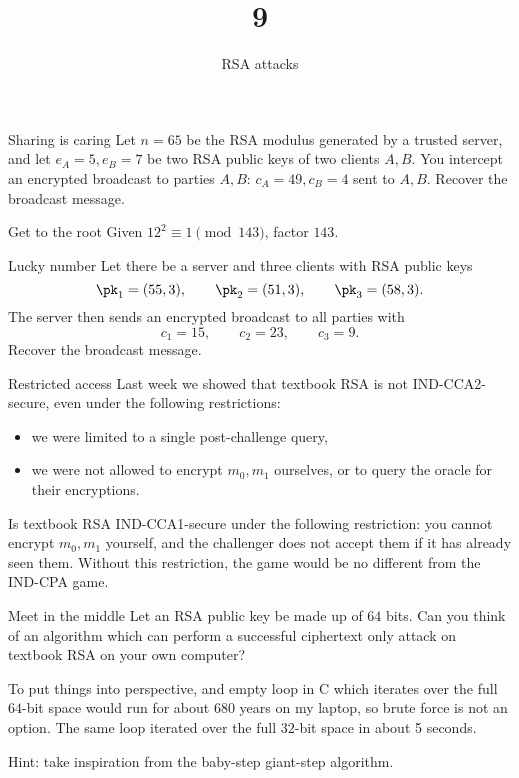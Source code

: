 \documentclass{practice}
\title{9}
\subtitle{RSA attacks}
\date{\DTMdate{2024-11-06}}
\begin{document}
\maketitle

\begin{task}{Sharing is caring}
  Let $n = 65$ be the RSA modulus generated by a trusted server, and let $e_A = 5, e_B = 7$ be two RSA public keys of two clients $A, B$.
  You intercept an encrypted broadcast to parties $A,B$: $c_A=49, c_B=4$ sent to $A, B$.
  Recover the broadcast message.
\end{task}

\begin{task}{Get to the root}
  Given $12^2 \equiv 1 \pmod{143}$, factor $143$.
\end{task}

\begin{task}{Lucky number}
  Let there be a server and three clients with RSA public keys
  \[
    \pk_1=(55, 3),\qquad \pk_2=(51, 3),\qquad \pk_3=(58, 3).
  \]
  The server then sends an encrypted broadcast to all parties with
  \[
    c_1 = 15,\qquad c_2 = 23,\qquad c_3 = 9.
  \]
  Recover the broadcast message.
\end{task}

\begin{task}{Restricted access}
  Last week we showed that textbook RSA is not IND-CCA2-secure, even under the following restrictions:
  \begin{itemize}
    \item we were limited to a single post-challenge query,
    \item we were not allowed to encrypt $m_0, m_1$ ourselves, or to query the oracle for their encryptions.
  \end{itemize}
  Is textbook RSA IND-CCA1-secure under the following restriction:
  you cannot encrypt $m_0, m_1$ yourself, and the challenger does not accept them if it has already seen them.
  Without this restriction, the game would be no different from the IND-CPA game.
\end{task}

\begin{task}{Meet in the middle}
  Let an RSA public key be made up of $64$ bits.
  Can you think of an algorithm which can perform a successful ciphertext only attack on textbook RSA on your own computer?

  To put things into perspective, and empty loop in C which iterates over the full $64$-bit space would run for about 680 years on my laptop, so brute force is not an option.
  The same loop iterated over the full $32$-bit space in about 5 seconds.

  Hint: take inspiration from the baby-step giant-step algorithm.
\end{task}
\end{document}
